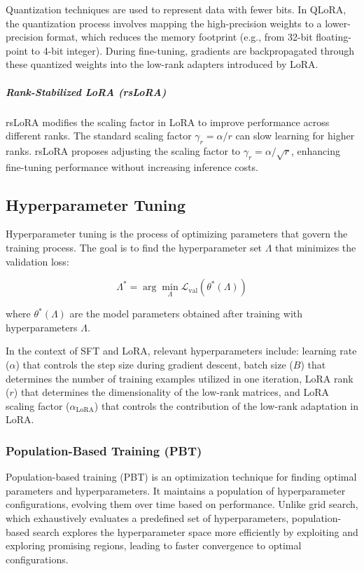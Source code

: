 \documentclass{article}
\newcounter{para}
\begin{document}
Quantization techniques are used to represent data with fewer bits. In QLoRA, the quantization process involves mapping the high-precision weights to a lower-precision format, which reduces the memory footprint (e.g., from 32-bit floating-point to 4-bit integer). During fine-tuning, gradients are backpropagated through these quantized weights into the low-rank adapters introduced by LoRA.

\subparagraph{Rank-Stabilized LoRA (rsLoRA)} \label{sec:pre-rslora}

rsLoRA modifies the scaling factor in LoRA to improve performance across different ranks. The standard scaling factor \( \gamma_r = \alpha / r \) can slow learning for higher ranks. rsLoRA proposes adjusting the scaling factor to \( \gamma_r = \alpha / \sqrt{r} \), enhancing fine-tuning performance without increasing inference costs.

\subsection{Hyperparameter Tuning} \label{sec:pre-hyperparam-tuning}

Hyperparameter tuning is the process of optimizing parameters that govern the training process. The goal is to find the hyperparameter set \( \Lambda \) that minimizes the validation loss:

\[
\Lambda^* = \arg\min_{\Lambda} \mathcal{L}_{\text{val}}(\theta^*(\Lambda))
\]

where \( \theta^*(\Lambda) \) are the model parameters obtained after training with hyperparameters \( \Lambda \).

In the context of SFT and LoRA, relevant hyperparameters include: learning rate (\( \alpha \)) that controls the step size during gradient descent, batch size (\( B \)) that determines the number of training examples utilized in one iteration, LoRA rank (\( r \)) that determines the dimensionality of the low-rank matrices, and LoRA scaling factor (\( \alpha_{\text{LoRA}} \)) that controls the contribution of the low-rank adaptation in LoRA.

\subsubsection{Population-Based Training (PBT)} \label{sec:pbt}

Population-based training (PBT) is an optimization technique for finding optimal parameters and hyperparameters. It maintains a population of hyperparameter configurations, evolving them over time based on performance. Unlike grid search, which exhaustively evaluates a predefined set of hyperparameters, population-based search explores the hyperparameter space more efficiently by exploiting and exploring promising regions, leading to faster convergence to optimal configurations.
\end{document}
